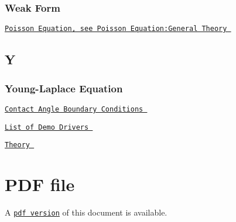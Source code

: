  \subsubsection*{ Weak Form }

 
\begin{DoxyItemize}
\item  \href{ ../../index/html/index.html#P.PoissonEquation.GeneralTheory }{\tt Poisson Equation, see Poisson Equation\-:General Theory }  
\end{DoxyItemize}  \subsection*{ Y }

 \subsubsection*{ Young-\/\-Laplace Equation }

 
\begin{DoxyItemize}
\item  \href{ ../../young_laplace/contact_angle/html/index.html }{\tt Contact Angle Boundary Conditions }  
\item  \href{ ../../example_code_list/html/index.html#young_laplace }{\tt List of Demo Drivers }  
\item  \href{ ../../young_laplace/young_laplace/html/index.html#theory }{\tt Theory }  
\end{DoxyItemize} 



 

 \hypertarget{index_pdf}{}\section{P\-D\-F file}\label{index_pdf}
A \href{../latex/refman.pdf}{\tt pdf version} of this document is available. 